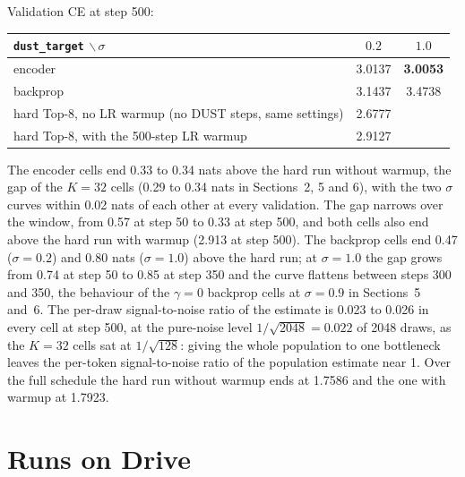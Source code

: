 \documentclass[11pt,a4paper]{article}
\newcommand{\code}[1]{\texttt{#1}}
\newcommand{\bst}[1]{\textbf{#1}}
\begin{document}
Validation CE at step 500:

\begin{center}\small
\begin{tabular}{lcc}
\toprule
\code{dust\_target} $\backslash\, \sigma$ & $0.2$ & $1.0$ \\
\midrule
encoder  & 3.0137 & \bst{3.0053} \\
backprop & 3.1437 & 3.4738 \\
\midrule
hard Top-8, no LR warmup (no DUST steps, same settings) & 2.6777 & \\
hard Top-8, with the 500-step LR warmup & 2.9127 & \\
\bottomrule
\end{tabular}
\end{center}

The encoder cells end 0.33 to 0.34 nats above the hard run without warmup,
the gap of the $K = 32$ cells (0.29 to 0.34 nats in Sections~2, 5 and 6),
with the two $\sigma$ curves within 0.02 nats of each other at every
validation. The gap narrows over the window, from 0.57 at step 50 to 0.33 at
step 500, and both cells also end above the hard run with warmup (2.913 at
step 500). The backprop cells end 0.47 ($\sigma = 0.2$) and 0.80 nats
($\sigma = 1.0$) above the hard run; at $\sigma = 1.0$ the gap grows from 0.74
at step 50 to 0.85 at step 350 and the curve flattens between steps 300 and
350, the behaviour of the $\gamma = 0$ backprop cells at $\sigma = 0.9$ in
Sections~5 and~6. The per-draw signal-to-noise ratio of the estimate is 0.023
to 0.026 in every cell at step 500, at the pure-noise level $1/\sqrt{2048} =
0.022$ of 2048 draws, as the $K = 32$ cells sat at $1/\sqrt{128}$: giving the
whole population to one bottleneck leaves the per-token signal-to-noise ratio
of the population estimate near 1. Over the full schedule the hard run
without warmup ends at 1.7586 and the one with warmup at 1.7923.

\section{Runs on Drive}
\end{document}
